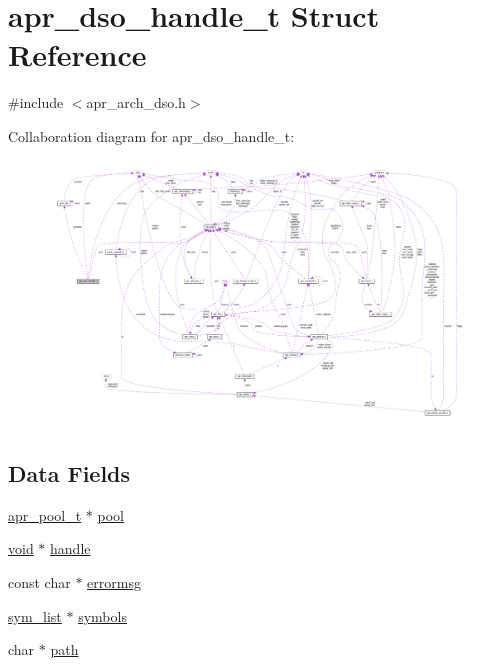 \hypertarget{structapr__dso__handle__t}{}\section{apr\+\_\+dso\+\_\+handle\+\_\+t Struct Reference}
\label{structapr__dso__handle__t}


{\ttfamily \#include $<$apr\+\_\+arch\+\_\+dso.\+h$>$}



Collaboration diagram for apr\+\_\+dso\+\_\+handle\+\_\+t\+:
\nopagebreak
\begin{figure}[H]
\begin{center}
\leavevmode
\includegraphics[width=350pt]{structapr__dso__handle__t__coll__graph}
\end{center}
\end{figure}
\subsection*{Data Fields}
\begin{DoxyCompactItemize}
\item 
\hyperlink{structapr__pool__t}{apr\+\_\+pool\+\_\+t} $\ast$ \hyperlink{structapr__dso__handle__t_a82adebd0d13a7029a019ae4b203231d3}{pool}
\item 
\hyperlink{group__MOD__ISAPI_gacd6cdbf73df3d9eed42fa493d9b621a6}{void} $\ast$ \hyperlink{structapr__dso__handle__t_ae6cec4aec10bfab9c900e5e780742037}{handle}
\item 
const char $\ast$ \hyperlink{structapr__dso__handle__t_a552832032c79c4cd8b813f27a2e5bca5}{errormsg}
\item 
\hyperlink{structsym__list}{sym\+\_\+list} $\ast$ \hyperlink{structapr__dso__handle__t_a75493ee1847724a7de3223e4d21316ad}{symbols}
\item 
char $\ast$ \hyperlink{structapr__dso__handle__t_a39ae3919219c28d034405ce5c2b6bbc9}{path}
\end{DoxyCompactItemize}


